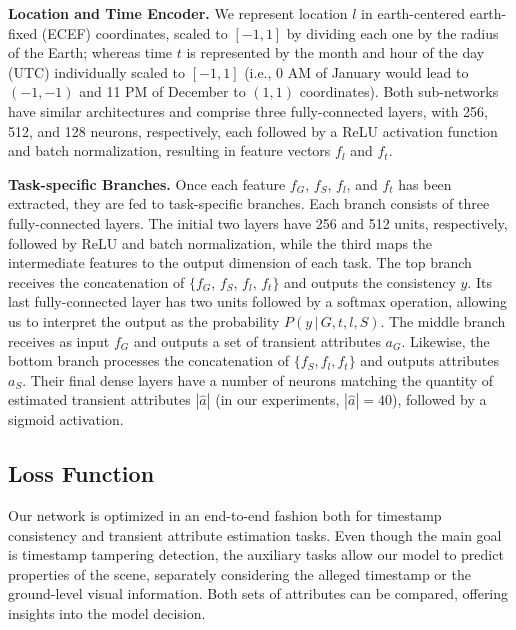 \documentclass[journal]{IEEEtran}
\begin{document}
        \noindent\textbf{Location and Time Encoder.} We represent location $l$ in earth-centered earth-fixed (ECEF) coordinates, scaled to $[-1, 1]$ by dividing each one by the radius of the Earth; whereas time $t$ is represented by the month and hour of the day (UTC) individually scaled to $[-1, 1]$ (i.e., 0 AM of January would lead to $(-1, -1)$ and 11 PM of December to $(1, 1)$ coordinates). Both sub-networks have similar architectures and comprise three fully-connected layers, with 256, 512, and 128 neurons, respectively, each followed by a ReLU activation function and batch normalization, resulting in feature vectors $f_{l}$ and $f_{t}$. \newline
        
        \noindent\textbf{Task-specific Branches.} Once each feature $f_{\textit{G}}$, $f_{\textit{S}}$, $f_{l}$, and $f_{t}$ has been extracted, they are fed to task-specific branches. Each branch consists of three fully-connected layers. The initial two layers have 256 and 512 units, respectively, followed by ReLU and batch normalization, while the third maps the intermediate features to the output dimension of each task. The top branch receives the concatenation of $\{f_{\textit{G}}$, $f_{\textit{S}}$, $f_{l}$, $f_{t}\}$ and outputs the consistency $y$. Its last fully-connected layer has two units followed by a softmax operation, allowing us to interpret the output as the probability $P(y\,|\,G, t, l, S)$. The middle branch receives as input $f_{\textit{G}}$ and outputs a set of transient attributes $a_{\textit{G}}$. Likewise, the bottom branch processes the concatenation of $\{f_{\textit{S}}, f_{l}, f_{t}\}$ and outputs attributes $a_{\textit{S}}$. Their final dense layers have a number of neurons matching the quantity of estimated transient attributes $|\hat{a}|$ (in our experiments, $|\hat{a}| = 40$), followed by a sigmoid activation.  
    
    \subsection{Loss Function}
        Our network is optimized in an end-to-end fashion both for timestamp consistency and transient attribute estimation tasks. Even though the main goal is timestamp tampering detection, the auxiliary tasks allow our model to predict properties of the scene, separately considering the alleged timestamp or the ground-level visual information. Both sets of attributes can be compared, offering insights into the model decision. 
        
\end{document}
